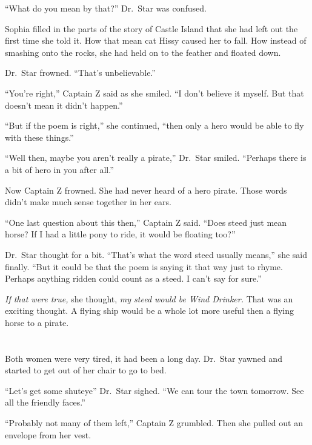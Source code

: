 \documentclass[12pt]{extbook}
\begin{document}
  \enquote{What do you mean by that?} Dr.~Star was confused.
  
  Sophia filled in the parts of the story of Castle Island that she had
  left out the first time she told it. How that mean cat Hissy caused her
  to fall. How instead of smashing onto the rocks, she had held on to the
  feather and floated down.
  
  Dr.~Star frowned. \enquote{That's unbelievable.}
  
  \enquote{You're right,} Captain Z said as she smiled. \enquote{I don't
  believe it myself. But that doesn't mean it didn't happen.}
  
  \enquote{But if the poem is right,} she continued, \enquote{then only a
  hero would be able to fly with these things.}
  
  \enquote{Well then, maybe you aren't really a pirate,} Dr.~Star smiled.
  \enquote{Perhaps there is a bit of hero in you after all.}
  
  Now Captain Z frowned. She had never heard of a hero pirate. Those words
  didn't make much sense together in her ears.
  
  \enquote{One last question about this then,} Captain Z said.
  \enquote{Does steed just mean horse? If I had a little pony to ride, it
  would be floating too?}
  
  Dr.~Star thought for a bit. \enquote{That's what the word steed usually
  means,} she said finally. \enquote{But it could be that the poem is
  saying it that way just to rhyme. Perhaps anything ridden could count as
  a steed. I can't say for sure.}
  
  \emph{If that were true,} she thought, \emph{my steed would be Wind
  Drinker.} That was an exciting thought. A flying ship would be a whole
  lot more useful then a flying horse to a pirate.
  
  \section{}\label{section-28}
  
  Both women were very tired, it had been a long day. Dr.~Star yawned and
  started to get out of her chair to go to bed.
  
  \enquote{Let's get some shuteye} Dr.~Star sighed. \enquote{We can tour
  the town tomorrow. See all the friendly faces.}
  
  \enquote{Probably not many of them left,} Captain Z grumbled. Then she
  pulled out an envelope from her vest.
  
\end{document}
